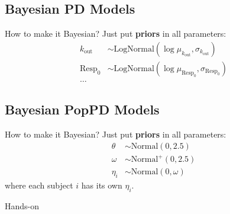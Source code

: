 \subsection{Bayesian PD Models}
\begin{frame}{How to make it Bayesian?}
    Just put \textbf{priors} in all parameters:
    $$
        \begin{aligned}
            k_{\text{out}} & \sim \text{LogNormal}(\log{\mu_{k_{\text{out}}}}, \sigma_{k_{\text{out}}}) \\
            \text{Resp}_0  & \sim \text{LogNormal}(\log{\mu_{\text{Resp}_0}}, \sigma_{\text{Resp}_0})   \\
            \ldots
        \end{aligned}
    $$
\end{frame}

\subsection{Bayesian PopPD Models}
\begin{frame}{How to make it Bayesian?}
    Just put \textbf{priors} in all parameters:
    $$
        \begin{aligned}
            \theta   & \sim \text{Normal}(0, 2.5)  \\
            \omega   & \sim \text{Normal}^+(0, 2.5)  \\
            \eta_{i} & \sim \text{Normal}(0, \omega)
        \end{aligned}
    $$
    \vfill
    where each subject $i$ has its own $\eta_i$.
\end{frame}

\begin{frame}{Hands-on}
\end{frame}
